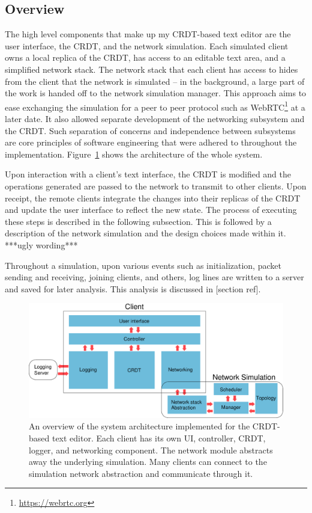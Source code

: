 \documentclass[12pt,a4paper,twoside,openright]{report}
\begin{document}
	\subsection{Overview}
	The high level components that make up my CRDT-based text editor are the user interface, the CRDT, and the network simulation. Each simulated client owns a local replica of the CRDT, has access to an editable text area, and a simplified network stack. The network stack that each client has access to hides from the client that the network is simulated -- in the background, a large part of the work is handed off to the network simulation manager. This approach aims to ease exchanging the simulation for a peer to peer protocol such as WebRTC\footnote{\url{https://webrtc.org}} at a later date. It also allowed separate development of the networking subsystem and the CRDT. Such separation of concerns and independence between subsystems are core principles of software engineering that were adhered to throughout the implementation. Figure~\ref{fig:sysarch} shows the architecture of the whole system.
	
	
	Upon interaction with a client's text interface, the CRDT is modified and the operations generated are passed to the network to transmit to other clients. Upon receipt, the remote clients integrate the changes into their replicas of the CRDT and update the user interface to reflect the new state. The process of executing these steps is described in the following subsection. This is followed by a description of the network simulation and the design choices made within it.  ***ugly wording***
	
	Throughout a simulation, upon various events such as initialization, packet sending and receiving, joining clients, and others, log lines are written to a server and saved for later analysis. This analysis is discussed in [section ref].
	
	\begin{figure}[H]
		\centering
		\includegraphics[width=1\linewidth]{figs/sysarch.eps}
		\caption[System Architecture]{An overview of the system architecture implemented for the CRDT-based text editor. Each client has its own UI, controller, CRDT, logger, and networking component. The network module abstracts away the underlying simulation. Many clients can connect to the simulation network abstraction and communicate through it.}
		\label{fig:sysarch}
	\end{figure}
	
\end{document}
